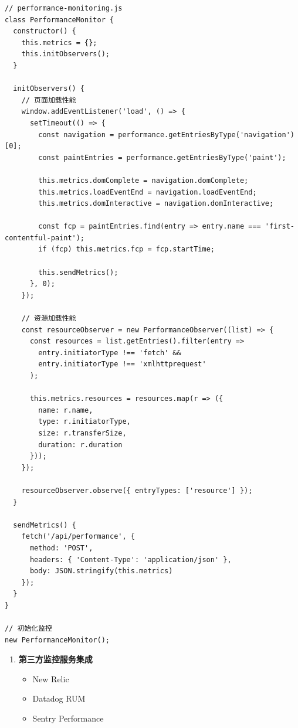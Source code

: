 \begin{lstlisting}
// performance-monitoring.js
class PerformanceMonitor {
  constructor() {
    this.metrics = {};
    this.initObservers();
  }
  
  initObservers() {
    // 页面加载性能
    window.addEventListener('load', () => {
      setTimeout(() => {
        const navigation = performance.getEntriesByType('navigation')[0];
        const paintEntries = performance.getEntriesByType('paint');
        
        this.metrics.domComplete = navigation.domComplete;
        this.metrics.loadEventEnd = navigation.loadEventEnd;
        this.metrics.domInteractive = navigation.domInteractive;
        
        const fcp = paintEntries.find(entry => entry.name === 'first-contentful-paint');
        if (fcp) this.metrics.fcp = fcp.startTime;
        
        this.sendMetrics();
      }, 0);
    });
    
    // 资源加载性能
    const resourceObserver = new PerformanceObserver((list) => {
      const resources = list.getEntries().filter(entry => 
        entry.initiatorType !== 'fetch' && 
        entry.initiatorType !== 'xmlhttprequest'
      );
      
      this.metrics.resources = resources.map(r => ({
        name: r.name,
        type: r.initiatorType,
        size: r.transferSize,
        duration: r.duration
      }));
    });
    
    resourceObserver.observe({ entryTypes: ['resource'] });
  }
  
  sendMetrics() {
    fetch('/api/performance', {
      method: 'POST',
      headers: { 'Content-Type': 'application/json' },
      body: JSON.stringify(this.metrics)
    });
  }
}

// 初始化监控
new PerformanceMonitor();
\end{lstlisting}

\begin{enumerate}
\def\labelenumi{\arabic{enumi}.}
\setcounter{enumi}{1}
\tightlist
\item
  \textbf{第三方监控服务集成}

  \begin{itemize}
  \tightlist
  \item
    New Relic
  \item
    Datadog RUM
  \item
    Sentry Performance
  \end{itemize}
\end{enumerate}

